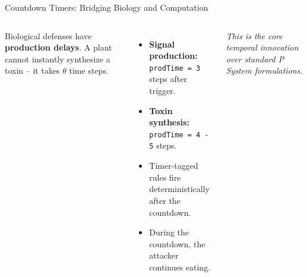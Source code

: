 \documentclass[aspectratio=169]{beamer}
\begin{document}
\begin{frame}{Countdown Timers: Bridging Biology and Computation}
    \begin{columns}[T, onlytextwidth]
        \vspace{0.2cm}
        Biological defenses have \textbf{production delays}. A plant cannot instantly synthesize a toxin -- it takes $\theta$ time steps.
        \vspace{0.3cm}
        \begin{itemize}
            \item \textbf{Signal production:} \texttt{prodTime = 3} steps after trigger.
            \item \textbf{Toxin synthesis:} \texttt{prodTime = 4 - 5} steps.
            \item Timer-tagged rules fire deterministically after the countdown.
            \item During the countdown, the attacker continues eating.
        \end{itemize}
        \vspace{0.2cm}
        \textit{This is the core temporal innovation over standard P System formulations.}


\end{columns}
\end{frame}
\end{document}
